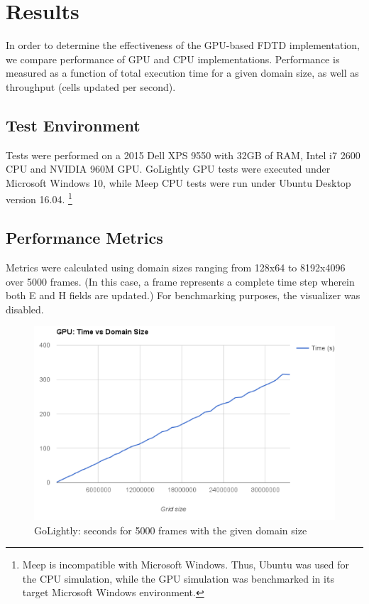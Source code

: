 \chapter{Results} \label{ch:conclusions}

In order to determine the effectiveness of the GPU-based FDTD implementation, we compare performance of GPU and CPU implementations. Performance is measured as a function of total execution time for a given domain size, as well as throughput (cells updated per second).

\section{Test Environment}

Tests were performed on a 2015 Dell XPS 9550 with 32GB of RAM, Intel i7 2600 CPU and NVIDIA 960M GPU. GoLightly GPU tests were executed under Microsoft Windows 10, while Meep CPU tests were run under Ubuntu Desktop version 16.04.   \footnote{Meep is incompatible with Microsoft Windows. Thus, Ubuntu was used for the CPU simulation, while the GPU simulation was benchmarked in its target Microsoft Windows environment.}

\section{Performance Metrics}

Metrics were calculated using domain sizes ranging from 128x64 to 8192x4096 over 5000 frames. (In this case, a frame represents a complete time step wherein both E and H fields are updated.) For benchmarking purposes, the visualizer was disabled.


\begin{figure}[H]
	\centering
	\includegraphics[width=\textwidth,
	keepaspectratio]{gpu_time_vs_domain_size.png}
	\caption{GoLightly: seconds for 5000 frames with the given domain size}
	\label{fig:gpuTimeVsDomainSize}
\end{figure}

